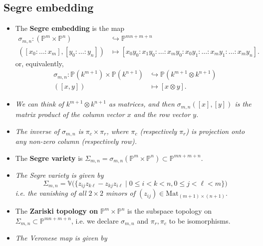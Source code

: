 \documentclass[10pt]{article}
\newcommand{\van}{\mathbb{V}}
\newcommand{\pee}{\mathbb{P}}
\begin{document}
        \subsection{Segre embedding}

            \begin{itemize}
                \item The \textbf{Segre embedding} is the map
                    \begin{align*}
                        \sigma_{m,n}\colon(\pee^m\times\pee^n)&\hookrightarrow\pee^{mn+m+n}\\
                        ([x_0:\ldots:x_m],[y_0:\ldots:y_n])&\mapsto[x_0y_0:x_1y_0:\ldots:x_my_0:x_0y_1:\ldots:x_my_1:\ldots:x_my_n].
                    \end{align*}
                    or, equivalently,
                    \begin{align*}
                        \sigma_{m,n}\colon\pee(k^{m+1})\times\pee(k^{n+1})&\hookrightarrow\pee(k^{m+1}\otimes k^{n+1})\\
                        ([x,y])&\mapsto [x\otimes y].
                    \end{align*}
                \item \emph{We can think of $k^{m+1}\otimes k^{n+1}$ as matrices, and then $\sigma_{m,n}([x],[y])$ is the matrix product of the column vector $x$ and the row vector $y$.}
                \item \emph{The inverse of $\sigma_{m,n}$ is $\pi_c\times\pi_r$, where $\pi_c$ (respectively $\pi_r$) is projection onto any non-zero column (respectively row).}
                \item The \textbf{Segre variety} is $\Sigma_{m,n}=\sigma_{m,n}(\pee^m\times\pee^n)\subset\pee^{mn+m+n}$.
                \item \emph{The Segre variety is given by}
                    \begin{equation*}
                        \Sigma_{m,n}=\van\big(\{z_{ij}z_{k\ell}-z_{kj}z_{i\ell}\mid 0\leqslant i<k<n, 0\leqslant j<\ell<m\}\big)
                    \end{equation*}
                    \emph{i.e. the vanishing of all $2\times2$ minors of $(z_{ij})\in\mathrm{Mat}_{(m+1)\times(n+1)}.$}
                \item The \textbf{Zariski topology on} $\pee^m\times\pee^n$ is the subspace topology on $\Sigma_{m,n}\subset\pee^{mn+m+n}$, i.e. we declare $\sigma_{m,n}$ and $\pi_r,\pi_c$ to be isomorphisms.
                \item \emph{The Veronese map is given by}

\end{itemize}
\end{document}
